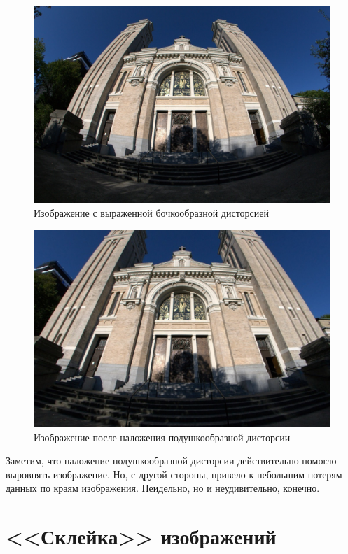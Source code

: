 \begin{figure}[h]
    \centering
    \includegraphics[scale=0.3]{../images/original/bd.jpg}
    \caption{Изображение с выраженной бочкообразной дисторсией}
\end{figure}
\begin{figure}[h]
    \centering
    \includegraphics[scale= 0.3 ]{../images/results/after_pd_applied_img.jpg}
    \caption{Изображение после наложения подушкообразной дисторсии}
\end{figure}
\noindent Заметим, что наложение подушкообразной дисторсии действительно помогло выровнять изображение.
Но, с другой стороны, привело к небольшим потерям данных по краям изображения. Неидельно, но и неудивительно, конечно.
\newpage

\section{<<Склейка>> изображений}
